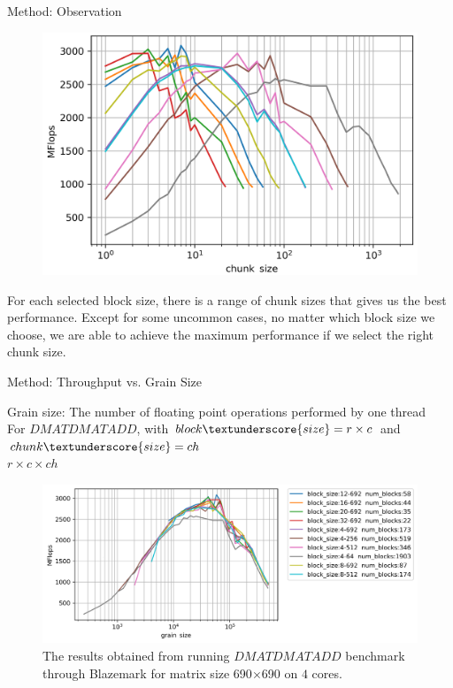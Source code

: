 \documentclass[10pt]{beamer}
\begin{document}
\begin{frame}{Method: Observation}
	\begin{outline}
		\begin{figure}
			\includegraphics[scale=0.2]{images/fig5_cropped.png}			
		\end{figure}
		\1For each selected block size, there is a range of chunk sizes that gives us the best performance. 
		\1Except for some uncommon cases, no matter which block size we choose, we are able to achieve the maximum performance if we select the right chunk size.  
	\end{outline}
\end{frame}

\begin{frame}{Method: Throughput vs. Grain Size}
	\begin{outline}
		Grain size: The number of floating point operations performed by one thread\\
		For $DMATDMATADD$, with $block\textunderscore{size}=r\times{c}$ and  $chunk\textunderscore{size}=ch$ \\ $r\times{c}\times{ch}$
		\begin{figure}[H]
			\centering\includegraphics[width=1\linewidth]{images/fig6.png}
			\caption{The results obtained from running $DMATDMATADD$ benchmark through Blazemark for matrix size 690$\times$690 on $4$ cores.}	
			\label{fig6}
		\end{figure}
	
	\end{outline}
\end{frame}
\end{document}
